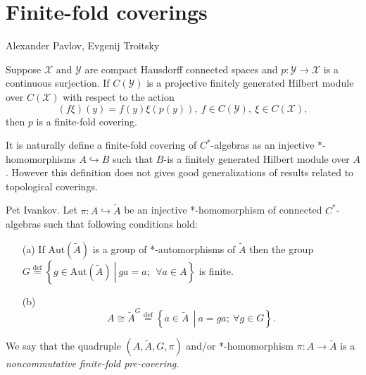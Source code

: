 \documentclass{beamer}
\theoremstyle{plain}
\newcommand{\be}{\begin{equation}}
\newcommand{\ee}{\end{equation}}
\newcommand{\Aut}{\mathrm{Aut}}
\newcommand{\bydef}{\stackrel{\mathrm{def}}{=}}
\newcommand{\hookto}{\hookrightarrow}        %
\begin{document}
\section{Finite-fold coverings}
 \begin{frame}
 	
 	\alert{Alexander Pavlov, Evgenij Troitsky}
 \begin{theorem}
 	Suppose $\mathcal X$ and $\mathcal Y$ are compact Hausdorff connected spaces and $p :\mathcal  Y \to \mathcal X$
 	is a continuous surjection. If $C(\mathcal Y )$ is a projective finitely generated Hilbert module over
 	$C(\mathcal X)$ with respect to the action
 	\begin{equation*}
 		(f\xi)(y) = f(y)\xi(p(y)), ~ f \in  C(\mathcal Y ), ~ \xi \in  C(\mathcal X),
 	\end{equation*}
 	then $p$ is a finite-fold  covering.
 \end{theorem}
  It is naturally define a finite-fold covering of $C^*$-algebras as an injective $*$-homomorphisms $A\hookto B$ such that $B$-is a finitely generated Hilbert module over
  $A$. However this definition does not gives good generalizations of results  related to topological coverings.
 
 \end{frame}
\begin{frame}
	   \begin{definition}\label{pre_defn} \alert{Pet Ivankov}.
	Let $\pi: A \hookto \widetilde{A}$ be an injective *-homomorphism of connected  $C^*$-algebras such that following conditions hold:
	\begin{enumerate}
		\item[(a)] If $\Aut\left(\widetilde{A} \right)$ is a group of *-automorphisms of $\widetilde{A}$ then the group  
		$
		G \bydef \left\{ \left.g \in \Aut\left(\widetilde{A} \right)~\right|~ ga = a;~~\forall a \in A\right\}
		$
		is finite.
		\item[(b)] 	\be\label{cond_b_eqn}
		A \cong \widetilde{A}^G\stackrel{\text{def}}{=}\left\{\left.a\in \widetilde{A}~~\right|~ a = g a;~ \forall g \in G\right\}.\ee
	\end{enumerate}
	We say that the quadruple $\left(A, \widetilde{A}, G, \pi \right)$ and/or *-homomorphism $\pi: A \to \widetilde{A}$   is a \textit{noncommutative finite-fold  pre-covering}. 
\end{definition}

\end{frame}
\end{document}

